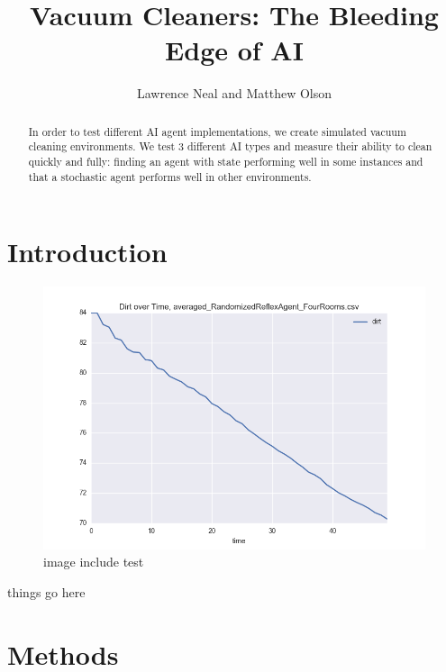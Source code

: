 \documentclass{article} %
\begin{document}
\title{Vacuum Cleaners: The Bleeding Edge of AI}

\author{Lawrence Neal and Matthew Olson}

\newcommand{\fix}{\marginpar{FIX}}
\newcommand{\new}{\marginpar{NEW}}

\iclrfinalcopy %

\maketitle

\begin{abstract}
    In order to test different AI agent implementations, we create simulated vacuum cleaning environments. We test 3 different AI types and measure their ability to clean quickly and fully: finding an agent with state performing well in some instances and that a stochastic agent performs well in other environments.
\end{abstract}

\section{Introduction}

\begin{figure}[h]
\begin{center}
    \includegraphics[width=\linewidth]{fig_001.png}
\end{center}
\caption{image include test}
\end{figure}

things go here

\section{Methods}
\end{document}
